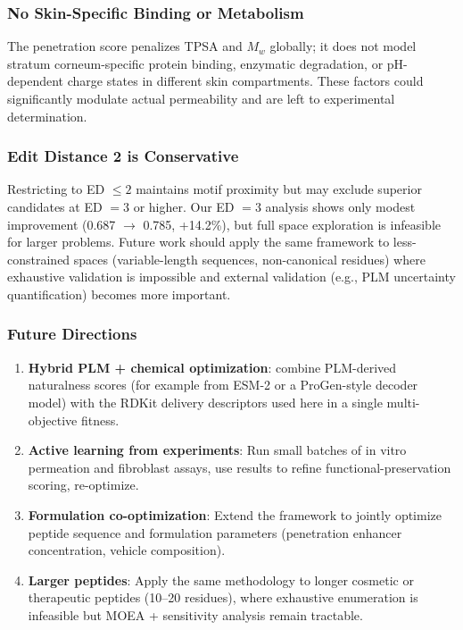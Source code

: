 \documentclass[11pt,letterpaper]{article}
\begin{document}
\subsubsection{No Skin-Specific Binding or Metabolism}

The penetration score penalizes TPSA and $M_w$ globally; it does not model stratum corneum-specific protein binding, enzymatic degradation, or pH-dependent charge states in different skin compartments. These factors could significantly modulate actual permeability and are left to experimental determination.

\subsubsection{Edit Distance 2 is Conservative}

Restricting to ED $\leq 2$ maintains motif proximity but may exclude superior candidates at ED $=3$ or higher. Our ED $=3$ analysis shows only modest improvement (0.687 $\to$ 0.785, +14.2\%), but full space exploration is infeasible for larger problems. Future work should apply the same framework to less-constrained spaces (variable-length sequences, non-canonical residues) where exhaustive validation is impossible and external validation (e.g., PLM uncertainty quantification) becomes more important.

\subsubsection{Future Directions}

\begin{enumerate}
  \item \textbf{Hybrid PLM + chemical optimization}: combine PLM-derived naturalness scores (for example from ESM-2 or a ProGen-style decoder model) with the RDKit delivery descriptors used here in a single multi-objective fitness.
  \item \textbf{Active learning from experiments}: Run small batches of in vitro permeation and fibroblast assays, use results to refine functional-preservation scoring, re-optimize.
  \item \textbf{Formulation co-optimization}: Extend the framework to jointly optimize peptide sequence and formulation parameters (penetration enhancer concentration, vehicle composition).
  \item \textbf{Larger peptides}: Apply the same methodology to longer cosmetic or therapeutic peptides (10--20 residues), where exhaustive enumeration is infeasible but MOEA + sensitivity analysis remain tractable.
\end{enumerate}
\end{document}
